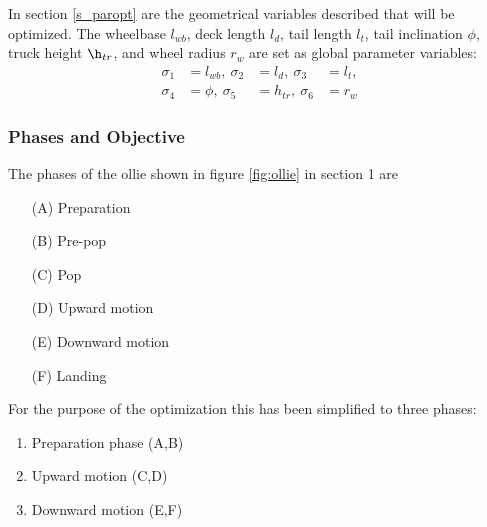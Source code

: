 In section \ref{s_paropt} are the geometrical variables described that will be optimized. The wheelbase $l_{wb}$, deck length $l_d$, tail length $l_t$, tail inclination $\phi$, truck height $\h_{tr}$, and wheel radius $r_w$ are set as global parameter variables:
\begin{equation}
\begin{array}{rlrl}
    \sigma_{1} &= l_{wb},\ \sigma_{2} &= l_d,\ \sigma_{3} &= l_t,   \\ 
    \sigma_{4} &= \phi,\ \sigma_{5} &= h_{tr},\  \sigma_{6} &= r_w 
\end{array}
\end{equation}

\subsubsection{Phases and Objective} \label{s_phases}
\noindent The phases of the ollie shown in figure \ref{fig:ollie} in section 1 are \cite{frederick_biomechanics_2006}
\begin{itemize}
    \item[(A)]Preparation
    \item[(B)]Pre-pop
    \item[(C)]Pop
    \item[(D)]Upward motion
    \item[(E)]Downward motion
    \item[(F)]Landing
\end{itemize}
For the purpose of the optimization this has been simplified to three phases:
\begin{enumerate} \label{n_phases}
    \item Preparation phase (A,B)
    \item Upward motion (C,D)
    \item Downward motion (E,F)
\end{enumerate}
